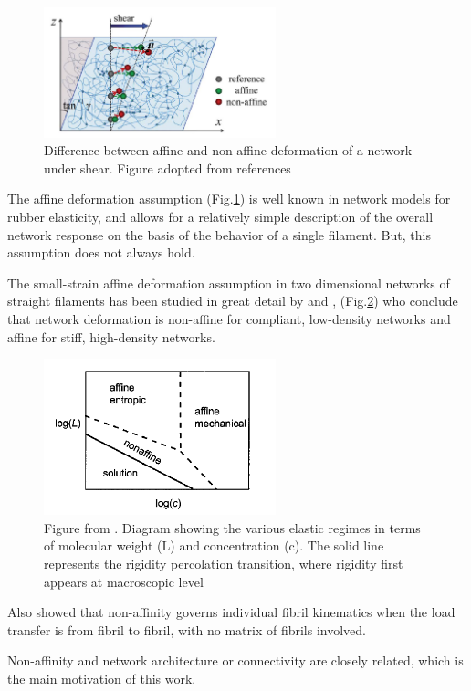  \begin{figure}[ht]
\begin{center}
\includegraphics[width=0.6\textwidth]{Figures/chapter-intro/nonaffine.png}%

\caption[Affine and non-affine deformations]{ Difference between affine
and non-affine deformation of a network under shear. Figure adopted from
references \citep{wen_non-affine_2012,basu_nonaffine_2011}
}
\label{fig:nonaffine}
\end{center}
\end{figure}
The affine deformation assumption (Fig.\ref{fig:nonaffine}) is well known in
network models for rubber elasticity, and allows for a relatively simple description of the overall network response on the basis of the  behavior
of a single filament. But, this assumption does not always hold.

The small-strain affine deformation assumption in two dimensional
networks of straight filaments has
been studied in great detail by \citet{head_distinct_2003,head_mechanical_2005}
and \citet{wilhelm_elasticity_2003}, (Fig.\ref{fig:nonaffine-head}) who conclude
that network deformation is non-affine for compliant, low-density networks
and affine for stiff, high-density networks.
 \begin{figure}[ht]
\begin{center}
\includegraphics[width=0.6\textwidth]{Figures/chapter-intro/nonaffine-head.png}%

\caption[Affine and non-affine phases]{ Figure from
\citet{head_mechanical_2005}. Diagram showing the various elastic regimes in
terms of molecular weight (L) and concentration (c). The solid line represents
the rigidity percolation transition, where rigidity first appears at
macroscopic level}
\label{fig:nonaffine-head}
\end{center}
\end{figure} 

 Also \citet{chandran_affine_2006}
showed that non-affinity governs individual fibril kinematics when the load
transfer is from fibril to fibril, with no matrix of fibrils involved.

Non-affinity and network architecture or connectivity are closely related, which
is the main motivation of this work.
